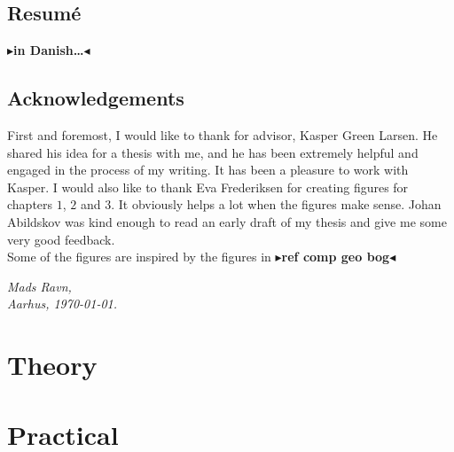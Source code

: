 \documentclass[twoside,11pt,openright]{report}
\newcommand{\todo}[1]{{\color[rgb]{.5,0,0}\textbf{$\blacktriangleright$#1$\blacktriangleleft$}}}
\begin{document}
\chapter*{Resum\'e}

\todo{in Danish\dots}

\chapter*{Acknowledgements}

First and foremost, I would like to thank for advisor, Kasper Green Larsen. He shared his idea for a thesis with me, and he has been extremely helpful and engaged in the process of my writing. It has been a pleasure to work with Kasper.
I would also like to thank Eva Frederiksen for creating figures for chapters $1$, $2$ and $3$. It obviously helps a lot when the figures make sense. Johan Abildskov was kind enough to read an early draft of my thesis and give me some very good feedback.\\

Some of the figures are inspired by the figures in \todo{ref comp geo bog}

\vspace{2ex}
\begin{flushright}
  \emph{Mads Ravn,}\\
  \emph{Aarhus, \today.}
\end{flushright}

\tableofcontents
{}
\setcounter{secnumdepth}{2}





\part{Theory}




\part{Practical}







 

\end{document}
